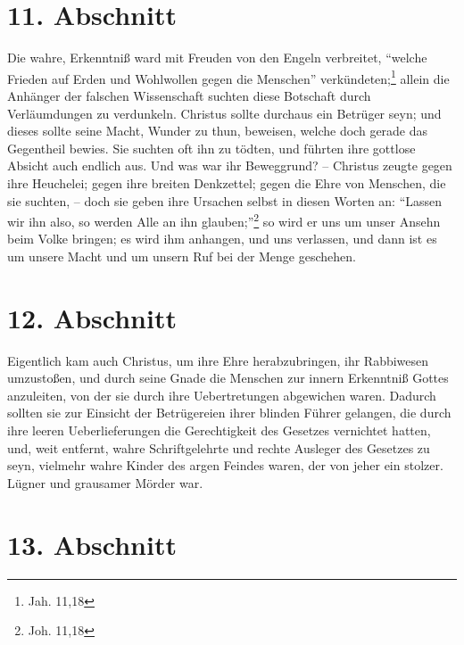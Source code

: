 \section{11. Abschnitt}

Die wahre, Erkenntniß ward mit Freuden von den Engeln verbreitet,  "`welche
Frieden auf Erden und Wohlwollen gegen die Menschen"'
verkündeten;\footnote{Jah. 11,18} allein die Anhänger der falschen Wissenschaft
suchten diese Botschaft durch Verläumdungen zu verdunkeln. Christus sollte
durchaus ein Betrüger seyn; und dieses sollte seine Macht, Wunder zu thun,
beweisen, welche doch gerade das Gegentheil bewies. Sie suchten oft ihn zu
tödten, und führten ihre gottlose Absicht auch endlich aus. Und was war ihr
Beweggrund? -- Christus zeugte gegen ihre Heuchelei; gegen ihre breiten
Denkzettel; gegen die Ehre von Menschen, die sie suchten, -- doch sie geben ihre
Ursachen selbst in diesen Worten an: "`Lassen wir ihn also, so werden Alle an
ihn glauben;"'\footnote{Joh. 11,18} so wird er uns um unser Ansehn beim Volke
bringen; es wird ihm anhangen, und uns verlassen, und dann ist es um unsere
Macht und um unsern Ruf bei der Menge geschehen.

\section{12. Abschnitt}

Eigentlich kam auch Christus, um ihre Ehre herabzubringen, ihr Rabbiwesen
umzustoßen, und durch seine Gnade die Menschen zur innern Erkenntniß Gottes
anzuleiten, von der sie durch ihre Uebertretungen abgewichen waren. Dadurch
sollten sie zur Einsicht der Betrügereien ihrer blinden Führer gelangen, die
durch ihre leeren Ueberlieferungen die Gerechtigkeit des Gesetzes vernichtet
hatten, und, weit entfernt, wahre Schriftgelehrte und rechte Ausleger des
Gesetzes zu seyn, vielmehr wahre Kinder des argen Feindes waren, der von jeher
ein stolzer. Lügner und grausamer Mörder war.

\section{13. Abschnitt}


